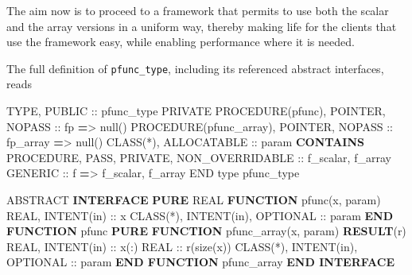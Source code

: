 \documentclass[]{scrartcl}
\newenvironment{Shaded}{}{}
\newcommand{\DataTypeTok}[1]{\textcolor[rgb]{0.56,0.13,0.00}{#1}}
\newcommand{\FunctionTok}[1]{\textcolor[rgb]{0.02,0.16,0.49}{#1}}
\newcommand{\KeywordTok}[1]{\textcolor[rgb]{0.00,0.44,0.13}{\textbf{#1}}}
\newcommand{\NormalTok}[1]{#1}
\newcommand{\OperatorTok}[1]{\textcolor[rgb]{0.40,0.40,0.40}{#1}}
\begin{document}
The aim now is to proceed to a framework that permits to use both the
scalar and the array versions in a uniform way, thereby making life for
the clients that use the framework easy, while enabling performance
where it is needed.

The full definition of \texttt{pfunc\_type}, including its referenced
abstract interfaces, reads

\begin{Shaded}
\begin{Highlighting}[]
\DataTypeTok{TYPE}\NormalTok{, }\DataTypeTok{PUBLIC} \DataTypeTok{::}\NormalTok{ pfunc\_type}
   \DataTypeTok{PRIVATE}
   \DataTypeTok{PROCEDURE(pfunc)}\NormalTok{, }\DataTypeTok{POINTER}\NormalTok{, }\DataTypeTok{NOPASS} \DataTypeTok{::}\NormalTok{ fp }\KeywordTok{=}\OperatorTok{\textgreater{}}\NormalTok{ null()}
   \DataTypeTok{PROCEDURE(pfunc\_array)}\NormalTok{, }\DataTypeTok{POINTER}\NormalTok{, }\DataTypeTok{NOPASS} \DataTypeTok{::}\NormalTok{ fp\_array }\KeywordTok{=}\OperatorTok{\textgreater{}}\NormalTok{ null()}
   \DataTypeTok{CLASS(*)}\NormalTok{, }\DataTypeTok{ALLOCATABLE} \DataTypeTok{::}\NormalTok{ param}
\KeywordTok{CONTAINS}
   \DataTypeTok{PROCEDURE}\NormalTok{, }\DataTypeTok{PASS}\NormalTok{, }\DataTypeTok{PRIVATE}\NormalTok{, }\DataTypeTok{NON\_OVERRIDABLE} \DataTypeTok{::}\NormalTok{ f\_scalar, f\_array}
   \DataTypeTok{GENERIC} \DataTypeTok{::}\NormalTok{ f }\KeywordTok{=}\OperatorTok{\textgreater{}}\NormalTok{ f\_scalar, f\_array}
\DataTypeTok{END type}\NormalTok{ pfunc\_type}

\DataTypeTok{ABSTRACT} \KeywordTok{INTERFACE}
   \KeywordTok{PURE} \DataTypeTok{REAL} \KeywordTok{FUNCTION}\NormalTok{ pfunc(x, param)}
      \DataTypeTok{REAL}\NormalTok{, }\DataTypeTok{INTENT(in)} \DataTypeTok{::}\NormalTok{ x}
      \DataTypeTok{CLASS(*)}\NormalTok{, }\DataTypeTok{INTENT(in)}\NormalTok{, }\DataTypeTok{OPTIONAL} \DataTypeTok{::}\NormalTok{ param}
   \KeywordTok{END FUNCTION}\NormalTok{ pfunc}
   \KeywordTok{PURE} \KeywordTok{FUNCTION}\NormalTok{ pfunc\_array(x, param) }\KeywordTok{RESULT}\NormalTok{(r)}
      \DataTypeTok{REAL}\NormalTok{, }\DataTypeTok{INTENT(in)} \DataTypeTok{::}\NormalTok{ x(:)}
      \DataTypeTok{REAL} \DataTypeTok{::}\NormalTok{ r(}\FunctionTok{size}\NormalTok{(x))}
      \DataTypeTok{CLASS(*)}\NormalTok{, }\DataTypeTok{INTENT(in)}\NormalTok{, }\DataTypeTok{OPTIONAL} \DataTypeTok{::}\NormalTok{ param}
   \KeywordTok{END FUNCTION}\NormalTok{ pfunc\_array}
\KeywordTok{END INTERFACE}
\end{Highlighting}
\end{Shaded}
\end{document}
